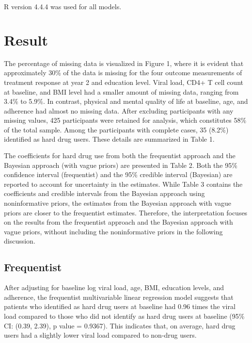 \documentclass[
  12pt,
]{article}
\begin{document}
R version 4.4.4 was used for all models.

\hypertarget{result}{%
\section{Result}\label{result}}

The percentage of missing data is visualized in Figure 1, where it is
evident that approximately 30\% of the data is missing for the four
outcome measurements of treatment response at year 2 and education
level. Viral load, CD4+ T cell count at baseline, and BMI level had a
smaller amount of missing data, ranging from 3.4\% to 5.9\%. In
contrast, physical and mental quality of life at baseline, age, and
adherence had almost no missing data. After excluding participants with
any missing values, 425 participants were retained for analysis, which
constitutes 58\% of the total sample. Among the participants with
complete cases, 35 (8.2\%) identified as hard drug users. These details
are summarized in Table 1.

The coefficients for hard drug use from both the frequentist approach
and the Bayesian approach (with vague priors) are presented in Table 2.
Both the 95\% confidence interval (frequentist) and the 95\% credible
interval (Bayesian) are reported to account for uncertainty in the
estimates. While Table 3 contains the coefficients and credible
intervals from the Bayesian approach using noninformative priors, the
estimates from the Bayesian approach with vague priors are closer to the
frequentist estimates. Therefore, the interpretation focuses on the
results from the frequentist approach and the Bayesian approach with
vague priors, without including the noninformative priors in the
following discussion.

\hypertarget{frequentist}{%
\subsection{Frequentist}\label{frequentist}}

After adjusting for baseline log viral load, age, BMI, education levels,
and adherence, the frequentist multivariable linear regression model
suggests that patients who identified as hard drug users at baseline had
0.96 times the viral load compared to those who did not identify as hard
drug users at baseline (95\% CI: (0.39, 2.39), p value = 0.9367). This
indicates that, on average, hard drug users had a slightly lower viral
load compared to non-drug users.
\end{document}
